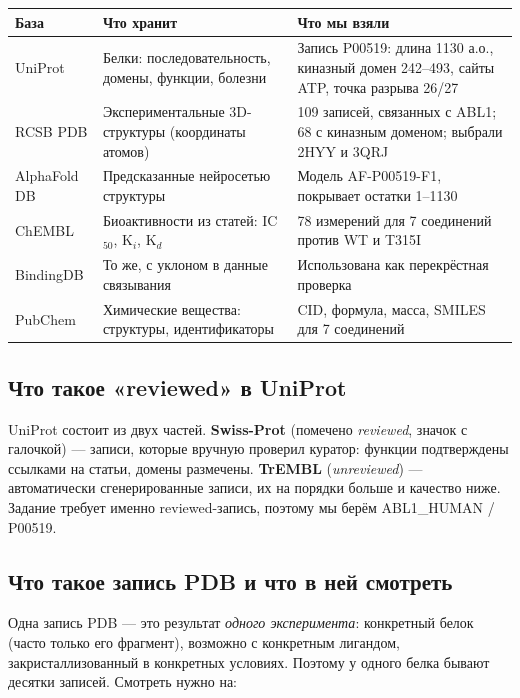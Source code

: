 \documentclass[11pt,a4paper]{article}
\newcommand{\code}[1]{{\ttfamily #1}}
\begin{document}
\begin{center}
\small
\begin{tabular}{L{2.4cm}L{5.4cm}L{6.6cm}}
\toprule
\textbf{База} & \textbf{Что хранит} & \textbf{Что мы взяли} \\
\midrule
UniProt & Белки: последовательность, домены, функции, болезни & Запись P00519: длина 1130 а.о., киназный домен 242--493, сайты ATP, точка разрыва 26/27 \\
RCSB PDB & Экспериментальные 3D-структуры (координаты атомов) & 109 записей, связанных с ABL1; 68 с киназным доменом; выбрали 2HYY и 3QRJ \\
AlphaFold DB & Предсказанные нейросетью структуры & Модель AF-P00519-F1, покрывает остатки 1--1130 \\
ChEMBL & Биоактивности из статей: IC$_{50}$, K$_i$, K$_d$ & 78 измерений для 7 соединений против WT и T315I \\
BindingDB & То же, с уклоном в данные связывания & Использована как перекрёстная проверка \\
PubChem & Химические вещества: структуры, идентификаторы & CID, формула, масса, SMILES для 7 соединений \\
\bottomrule
\end{tabular}
\end{center}

\subsection{Что такое «reviewed» в UniProt}

UniProt состоит из двух частей. \textbf{Swiss-Prot} (помечено \emph{reviewed},
значок с галочкой) --- записи, которые вручную проверил куратор: функции
подтверждены ссылками на статьи, домены размечены. \textbf{TrEMBL}
(\emph{unreviewed}) --- автоматически сгенерированные записи, их на порядки больше
и качество ниже. Задание требует именно reviewed-запись, поэтому мы берём
\code{ABL1\_HUMAN} / \code{P00519}.

\subsection{Что такое запись PDB и что в ней смотреть}

Одна запись PDB --- это результат \emph{одного эксперимента}: конкретный белок
(часто только его фрагмент), возможно с конкретным лигандом, закристаллизованный
в конкретных условиях. Поэтому у одного белка бывают десятки записей. Смотреть
нужно на:
\end{document}
